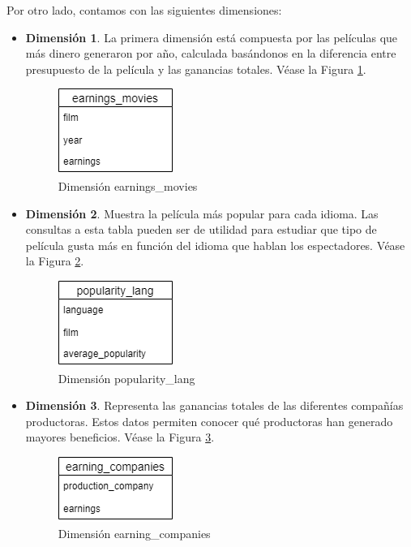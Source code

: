 \documentclass[11pt,a4paper]{article}
\begin{document}
Por otro lado, contamos con las siguientes dimensiones:

\begin{itemize}
	\item \textbf{Dimensión 1}. La primera dimensión está compuesta por las películas que más dinero generaron por año, calculada basándonos en la diferencia entre presupuesto de la película y las ganancias totales. Véase la Figura \ref{fig:dim1}.
	
	\begin{figure}[h]
		\centering
		\includegraphics[width=0.2\linewidth]{./images/Dimension1.png} 
		\caption{Dimensión earnings\_movies}
		\label{fig:dim1}
	\end{figure}
	
	\item \textbf{Dimensión 2}. Muestra la película más popular para cada idioma. Las consultas a esta tabla pueden ser de utilidad para estudiar que tipo de película gusta más en función del idioma que hablan los espectadores. Véase la Figura \ref{fig:dim2}.
	
	\begin{figure}[h]
		\centering
		\includegraphics[width=0.2\linewidth]{./images/Dimension2.png} 
		\caption{Dimensión popularity\_lang}
		\label{fig:dim2}
	\end{figure}
	
	\item \textbf{Dimensión 3}. Representa las ganancias totales de las diferentes compañías productoras. Estos datos permiten conocer qué productoras han generado mayores beneficios. Véase la Figura \ref{fig:dim3}.
	
	\begin{figure}[h]
		\centering
		\includegraphics[width=0.2\linewidth]{./images/Dimension3.png} 
		\caption{Dimensión earning\_companies}
		\label{fig:dim3}
	\end{figure}
	

\end{itemize}
\end{document}
